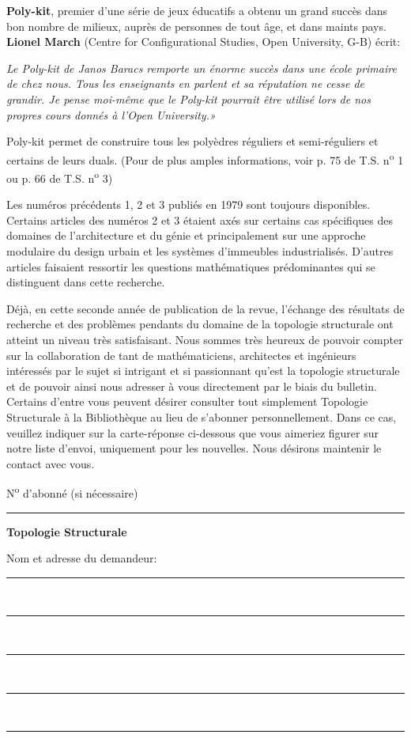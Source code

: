 \textbf{Poly-kit}, premier d’une série de jeux éducatifs a obtenu un grand succès dans bon nombre de milieux, auprès de personnes de tout âge, et dans maints pays. \textbf{Lionel March} (Centre for Configurational Studies, Open University, G-B) écrit:

\textit{Le Poly-kit de Janos Baracs remporte un énorme succès dans une école primaire de chez nous. Tous les enseignants en parlent et sa réputation ne cesse de grandir. Je pense moi-même que le Poly-kit pourrait être utilisé lors de nos propres cours donnés à l’Open University.»}

Poly-kit permet de construire tous les polyèdres réguliers et semi-réguliers et certains de leurs duals. (Pour de plus amples informations, voir p. 75 de T.S. n\textsuperscript{o} 1 ou p. 66 de T.S. n\textsuperscript{o} 3)

Les numéros précédents 1, 2 et 3 publiés en 1979 sont toujours disponibles. Certains articles des numéros 2 et 3 étaient axés sur certains cas spécifiques des domaines de l’architecture et du génie et principalement sur une approche modulaire du design urbain et les systèmes d’immeubles industrialisés. D’autres articles faisaient ressortir les questions mathématiques prédominantes qui se distinguent dans cette recherche.

Déjà, en cette seconde année de publication de la revue, l’échange des résultats de recherche et des problèmes pendants du domaine de la topologie structurale ont atteint un niveau très satisfaisant. Nous sommes très heureux de pouvoir compter sur la collaboration de tant de mathématiciens, architectes et ingénieurs intéressés par le sujet si intrigant et si passionnant qu’est la topologie structurale et de pouvoir ainsi nous adresser à vous directement par le biais du bulletin. Certains d’entre vous peuvent désirer consulter tout simplement Topologie Structurale à la Bibliothèque au lieu de s’abonner personnellement. Dans ce cas, veuillez indiquer sur la carte-réponse ci-dessous que vous aimeriez figurer sur notre liste d’envoi, uniquement pour les nouvelles. Nous désirons maintenir le contact avec vous.

\noindent\dotfill

N\textsuperscript{o} d’abonné (si nécessaire) \rule{1cm}{.4pt}\hfill\textbf{Topologie Structurale}

Nom et adresse du demandeur:

\begin{center}
\rule{.78\linewidth}{.4pt}\\
\rule{.78\linewidth}{.4pt}\\
\rule{.78\linewidth}{.4pt}\\
\rule{.78\linewidth}{.4pt}\\
\rule{.78\linewidth}{.4pt}
\end{center}

